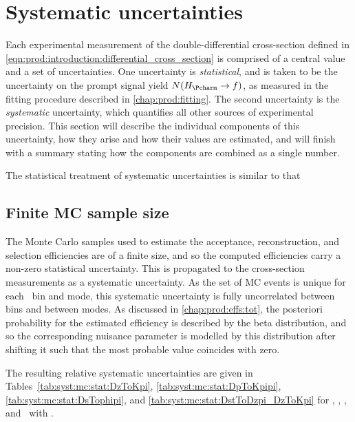 \chapter{Systematic uncertainties}
\label{chap:prod:syst}

Each experimental measurement of the double-differential cross-section defined 
in \cref{eqn:prod:introduction:differential_cross_section} is comprised of a 
central value and a set of uncertainties.
One uncertainty is \emph{statistical}, and is taken to be the uncertainty on 
the prompt signal yield $N(\HcTof)$, as measured in the fitting procedure 
described in \cref{chap:prod:fitting}.
The second uncertainty is the \emph{systematic} uncertainty, which quantifies 
all other sources of experimental precision.
This section will describe the individual components of this uncertainty, how 
they arise and how their values are estimated, and will finish with a summary 
stating how the components are combined as a single number.

The statistical treatment of systematic uncertainties is similar to that

\section{Finite \acl{MC} sample size}
\label{chap:prod::syst:mcstat}

The Monte Carlo samples used to estimate the acceptance, reconstruction, and 
selection efficiencies are of a finite size, and so the computed efficiencies 
carry a non-zero statistical uncertainty.
This is propagated to the cross-section measurements as a systematic 
uncertainty.
As the set of \ac{MC} events is unique for each \pTy\ bin and mode, this 
systematic uncertainty is fully uncorrelated between bins and between modes.
As discussed in \cref{chap:prod:effs:tot}, the posteriori probability 
for the estimated efficiency is described by the beta distribution, and so 
the corresponding nuisance parameter is modelled by this distribution after 
shifting it such that the most probable value coincides with zero.

The resulting relative systematic uncertainties are given in 
Tables~\ref{tab:syst:mc:stat:DzToKpi},
\ref{tab:syst:mc:stat:DpToKpipi},
\ref{tab:syst:mc:stat:DsTophipi}, and
\ref{tab:syst:mc:stat:DstToDzpi_DzToKpi} for \DzToKpi, \DpToKpipi, \DspTophipi, 
and \DstToDzpi\ with \DzToKpi.

